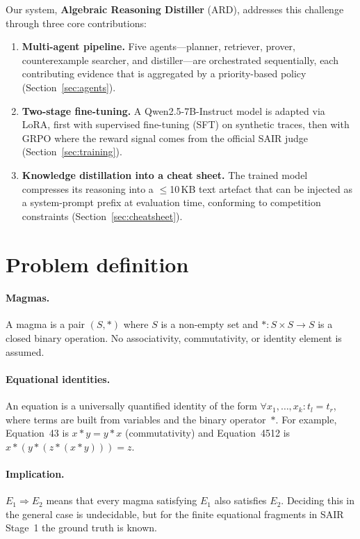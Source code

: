 \documentclass{article}
\begin{document}
Our system, \textbf{Algebraic Reasoning Distiller} (ARD), addresses this challenge through three core contributions:

\begin{enumerate}[leftmargin=*,itemsep=2pt]
  \item \textbf{Multi-agent pipeline.} Five agents---planner, retriever, prover, counterexample searcher, and distiller---are orchestrated sequentially, each contributing evidence that is aggregated by a priority-based policy (Section~\ref{sec:agents}).
  \item \textbf{Two-stage fine-tuning.} A Qwen2.5-7B-Instruct model is adapted via LoRA, first with supervised fine-tuning (SFT) on synthetic traces, then with GRPO where the reward signal comes from the official SAIR judge (Section~\ref{sec:training}).
  \item \textbf{Knowledge distillation into a cheat sheet.} The trained model compresses its reasoning into a $\leq$10\,KB text artefact that can be injected as a system-prompt prefix at evaluation time, conforming to competition constraints (Section~\ref{sec:cheatsheet}).
\end{enumerate}

\section{Problem definition}
\label{sec:problem}

\paragraph{Magmas.} A magma is a pair $(S, *)$ where $S$ is a non-empty set and $*\colon S \times S \to S$ is a closed binary operation. No associativity, commutativity, or identity element is assumed.

\paragraph{Equational identities.} An equation is a universally quantified identity of the form $\forall x_1,\dots,x_k\colon t_l = t_r$, where terms are built from variables and the binary operator~$*$. For example, Equation~43 is $x * y = y * x$ (commutativity) and Equation~4512 is $x * (y * (z * (x * y))) = z$.

\paragraph{Implication.} $E_1 \Rightarrow E_2$ means that every magma satisfying $E_1$ also satisfies $E_2$. Deciding this in the general case is undecidable, but for the finite equational fragments in SAIR Stage~1 the ground truth is known.
\end{document}
